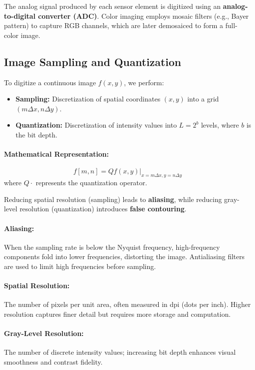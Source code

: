 \documentclass[12pt,a4paper]{AnantDocumentation}
\begin{document}
The analog signal produced by each sensor element is digitized using an \textbf{analog-to-digital converter (ADC)}. Color imaging employs mosaic filters (e.g., Bayer pattern) to capture RGB channels, which are later demosaiced to form a full-color image.

\subsection{Image Sampling and Quantization}
To digitize a continuous image $f(x, y)$, we perform:
\begin{itemize}
\item \textbf{Sampling:} Discretization of spatial coordinates $(x, y)$ into a grid $(m\Delta x, n\Delta y)$.
\item \textbf{Quantization:} Discretization of intensity values into $L = 2^b$ levels, where $b$ is the bit depth.
\end{itemize}

\paragraph{Mathematical Representation:}
\begin{equation}
f[m, n] = Q{f(x, y)}|_{x=m\Delta x, y=n\Delta y}
\end{equation}
where $Q{\cdot}$ represents the quantization operator.

Reducing spatial resolution (sampling) leads to \textbf{aliasing}, while reducing gray-level resolution (quantization) introduces \textbf{false contouring}.

\paragraph{Aliasing:} When the sampling rate is below the Nyquist frequency, high-frequency components fold into lower frequencies, distorting the image. Antialiasing filters are used to limit high frequencies before sampling.

\paragraph{Spatial Resolution:} The number of pixels per unit area, often measured in dpi (dots per inch). Higher resolution captures finer detail but requires more storage and computation.

\paragraph{Gray-Level Resolution:} The number of discrete intensity values; increasing bit depth enhances visual smoothness and contrast fidelity.
\end{document}
